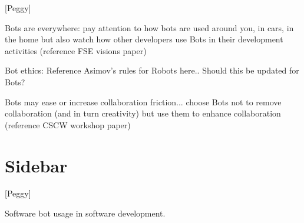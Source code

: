 \documentclass{sig-alternate}
\begin{document}
[Peggy]

	Bots are everywhere: pay attention to how bots are used around you, in cars, in the home but also watch how other developers use Bots in their development activities (reference FSE visions paper)
	
	Bot ethics:  Reference Asimov's rules for Robots here..   Should this be updated for Bots?
	
	Bots may ease or increase collaboration friction...  choose Bots not to remove collaboration (and in turn creativity) but use them to enhance collaboration (reference CSCW workshop paper)



\section{Sidebar}

[Peggy]

Software bot usage in software development.




%



%


%

\listoftodos
%
%
\end{document}
